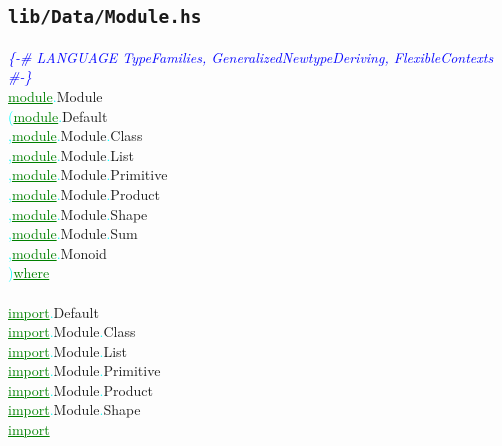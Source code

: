 \subsection{\texttt{lib/Data/Module.hs}}
\label{mod:Data.Module}
\textcolor{blue}{{\it{}\{-\# LANGUAGE TypeFamilies, GeneralizedNewtypeDeriving, FlexibleContexts \#-\}}}\\\textcolor{green}{\underline{module}}\textcolor{cyan}{.}{\rm{}Module}\\\hstab \textcolor{cyan}{(}\hsspace \textcolor{green}{\underline{module}}\textcolor{cyan}{.}{\rm{}Default}\\\hstab \textcolor{cyan}{,}\hsspace \textcolor{green}{\underline{module}}\textcolor{cyan}{.}{\rm{}Module}\textcolor{cyan}{.}{\rm{}Class}\\\hstab \textcolor{cyan}{,}\hsspace \textcolor{green}{\underline{module}}\textcolor{cyan}{.}{\rm{}Module}\textcolor{cyan}{.}{\rm{}List}\\\hstab \textcolor{cyan}{,}\hsspace \textcolor{green}{\underline{module}}\textcolor{cyan}{.}{\rm{}Module}\textcolor{cyan}{.}{\rm{}Primitive}\\\hstab \textcolor{cyan}{,}\hsspace \textcolor{green}{\underline{module}}\textcolor{cyan}{.}{\rm{}Module}\textcolor{cyan}{.}{\rm{}Product}\\\hstab \textcolor{cyan}{,}\hsspace \textcolor{green}{\underline{module}}\textcolor{cyan}{.}{\rm{}Module}\textcolor{cyan}{.}{\rm{}Shape}\\\hstab \textcolor{cyan}{,}\hsspace \textcolor{green}{\underline{module}}\textcolor{cyan}{.}{\rm{}Module}\textcolor{cyan}{.}{\rm{}Sum}\\\hstab \textcolor{cyan}{,}\hsspace \textcolor{green}{\underline{module}}\textcolor{cyan}{.}{\rm{}Monoid}\\\hstab \textcolor{cyan}{)}\hsspace \textcolor{green}{\underline{where}}\\\\\textcolor{green}{\underline{import}}\textcolor{cyan}{.}{\rm{}Default}\\\textcolor{green}{\underline{import}}\textcolor{cyan}{.}{\rm{}Module}\textcolor{cyan}{.}{\rm{}Class}\\\textcolor{green}{\underline{import}}\textcolor{cyan}{.}{\rm{}Module}\textcolor{cyan}{.}{\rm{}List}\\\textcolor{green}{\underline{import}}\textcolor{cyan}{.}{\rm{}Module}\textcolor{cyan}{.}{\rm{}Primitive}\\\textcolor{green}{\underline{import}}\textcolor{cyan}{.}{\rm{}Module}\textcolor{cyan}{.}{\rm{}Product}\\\textcolor{green}{\underline{import}}\textcolor{cyan}{.}{\rm{}Module}\textcolor{cyan}{.}{\rm{}Shape}\\\textcolor{green}{\underline{import}}\hsspace 